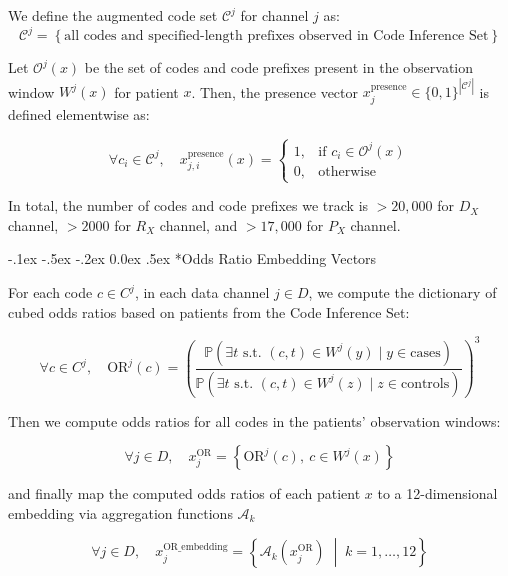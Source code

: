 \documentclass[onecolumn, compsoc,11pt]{IEEEtran}
\makeatletter
\renewcommand\paragraph{\@startsection {section}{1}{\z@}
  {-.1ex \@plus -.5ex \@minus -.2ex}
  {0.0ex \@plus.5ex}
  {\fontsize{11}{10}\selectfont\bfseries\itshape\sffamily}}
\makeatother
\begin{document}
We define the augmented code set $\mathcal{C}^j$ for channel $j$ as:
\[
\mathcal{C}^j = \left\{ \text{all codes and specified-length prefixes observed in Code Inference Set} \right\}
\]

Let $\mathcal{O}^j(x)$ be the set of codes and code prefixes present in the observation window $W^j(x)$ for patient $x$. Then, the presence vector $x^{\text{presence}}_j \in \{0, 1\}^{|\mathcal{C}^j|}$ is defined elementwise as:

\begin{equation}
\forall c_i \in \mathcal{C}^j, \quad x^{\text{presence}}_{j,i}(x) =
\begin{cases}
1, & \text{if } c_i \in \mathcal{O}^j(x) \\
0, & \text{otherwise}
\end{cases}
\end{equation}

In total, the number of codes and code prefixes we track is $>20,000$ for $D_X$ channel, $>2000$ for $R_X$ channel, and $>17,000$ for $P_X$ channel. 


\paragraph*{Odds Ratio Embedding Vectors}

For each code $c \in C^j$, in each data channel $j \in D$, we compute the dictionary of cubed odds ratios based on patients from the Code Inference Set:

\begin{equation}
\forall c \in C^j, \quad \text{OR}^j(c) = \left( \frac{\mathbb{P}(\exists t \text{ s.t. } (c, t) \in W^j(y) \mid y \in \text{cases})}{\mathbb{P}(\exists t \text{ s.t. } (c, t) \in W^j(z) \mid z \in \text{controls})} \right)^3
\end{equation}

Then we compute odds ratios for all codes in the patients' observation windows:

\begin{equation}
\forall j \in D, \quad x^{\text{OR}}_j = \left\{ \text{OR}^j(c), \ c \in W^j(x) \right\}
\end{equation}

and finally map the computed odds ratios of each patient $x$ to a 12-dimensional embedding via aggregation functions $\mathcal{A}_k$

\begin{equation}
\forall j \in D, \quad x^{\text{OR\_embedding}}_j = \left\{ \mathcal{A}_k\left(x^{\text{OR}}_j \right) \;\middle|\; k = 1, \ldots, 12 \right\}
\end{equation}
\end{document}
